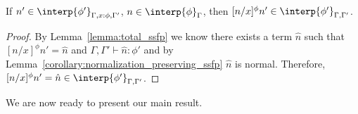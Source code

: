 \begin{lemma}
  If $n' \in \interp{\phi'}_{\Gamma,x:\phi,\Gamma'}$, $n \in \interp{\phi}_\Gamma$, then 
  $[n/x]^\phi n' \in \interp{\phi'}_{\Gamma,\Gamma'}$.
  \label{lemma:interpretation_of_types_closed_substitution_ssfp}
\end{lemma}
\begin{proof}
  By Lemma~\ref{lemma:total_ssfp} we know there exists a term $\hat{n}$ 
  such that $[n/x]^\phi n' = \hat{n}$ and $\Gamma,\Gamma' \vdash \hat{n}:\phi'$ and by 
  Lemma~\ref{corollary:normalization_preserving_ssfp} $\hat{n}$ is normal.  Therefore,
  $[n/x]^\phi n' = \hat{n} \in \interp{\phi'}_{\Gamma,\Gamma'}$.
\end{proof}
\noindent
We are now ready to present our main result.

